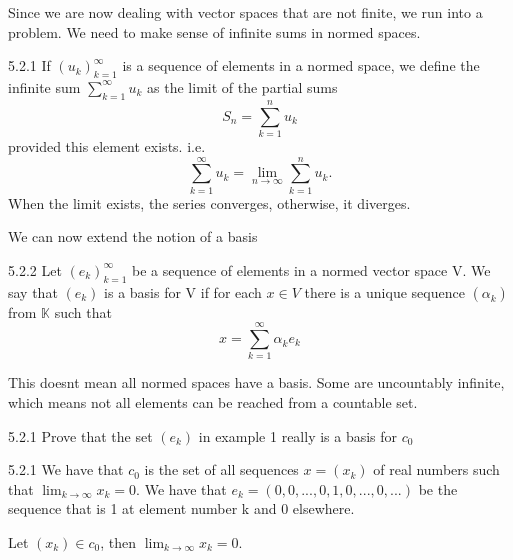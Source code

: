 \documentclass[a4paper,norsk]{article}
\begin{document}
Since we are now dealing with vector spaces that are not finite, we run into a problem. We need to make sense of infinite sums in normed spaces.

\begin{definitionbox}{5.2.1}{}
If $ \left( u_k \right) _{k=1} ^{\infty}  $ is a sequence of elements in a normed space, we define the infinite sum $ \sum_{ k=1 }^{ \infty } u_k  $ as the limit of the partial sums 
\[
    S_n = \sum_{ k=1 }^{ n } u_k
\]
provided this element exists. i.e.
\[
    \sum_{ k=1 }^{ \infty } u_k = \lim_{n \to \infty}  \sum_{ k=1 }^{ n } u_k.
\]
When the limit exists, the series converges, otherwise, it diverges.
\end{definitionbox}


We can now extend the notion of a basis
\begin{definitionbox}{5.2.2}{}
Let $ \left( e_k \right) _{k=1} ^{\infty}  $ be a sequence of elements in a normed vector space V. We say that $ \left( e_k \right)  $ is a basis for V if for each $ x \in V $ there is a unique sequence $ \left( \alpha_{k}^{} \right)   $ from $ \mathbb{K}  $ such that
\[
    x = \sum_{ k=1 }^{ \infty} \alpha_{k}^{} e_k  
\]
\end{definitionbox}


This doesnt mean all normed spaces have a basis. Some are uncountably infinite, which means not all elements can be reached from a countable set.




\begin{oppgavebox}{5.2.1}{}
Prove that the set $ \left( e_k \right)  $ in example 1 really is a basis for $ c_0 $ 

\begin{proofbox}{5.2.1}{}
  We have that $ c_0 $ is the set of all sequences $ x = \left( x_k \right)  $ of real numbers such that $ \lim_{k \to \infty} x_k = 0  $. We have that $ e_k = \left( 0, 0, ..., 0, 1, 0, ..., 0, ...\right)  $ be the sequence that is 1 at element number k and 0 elsewhere. 

  Let $ \left( x_k \right)  \in c_0 $, then $ \lim_{k \to \infty} x_k = 0  $.  
\end{proofbox}
\end{oppgavebox}
\end{document}
